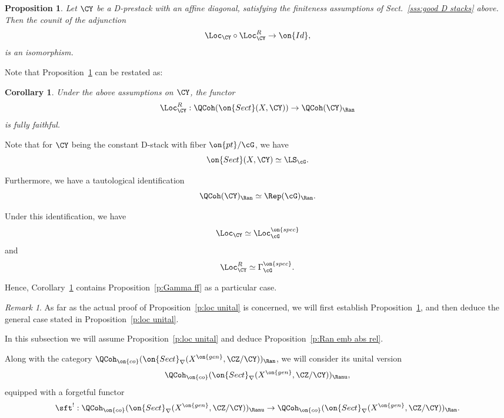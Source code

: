 \documentclass[9pt]{amsart}
\newtheorem{cor}[subsubsection]{Corollary}
\newtheorem{prop}[subsubsection]{Proposition}
\theoremstyle{remark}
\newtheorem{rem}[subsubsection]{Remark}
\theoremstyle{definition}
\theoremstyle{remark}
\newcommand{\secref}[1]{Sect.~\ref{#1}}
\newcommand{\propref}[1]{Proposition~\ref{#1}}
\newcommand{\corref}[1]{Corollary~\ref{#1}}
\numberwithin{equation}{section}
\begin{document}
\begin{prop} \label{p:loc unital fund}
Let $\CY$ be a D-prestack with an affine diagonal, satisfying the finiteness assumptions of \secref{sss:good D stacks} above. 
Then the counit of the adjunction 
$$\Loc_\CY\circ \Loc^R_\CY \to \on{Id},$$
is an isomorphism.
\end{prop} 

Note that \propref{p:loc unital fund} can be restated as:

\begin{cor} \label{c:loc unital bis}
Under the above assumptions on $\CY$, the functor
$$\Loc^R_\CY:\QCoh(\on{Sect}(X,\CY))\to \QCoh(\CY)_\Ran$$
is fully faithful.
\end{cor}

\sssec{} \label{sss:proof Gamma spec ff}

Note that for $\CY$ being the constant D-stack with fiber $\on{pt}/\cG$, we have
$$\on{Sect}(X,\CY)\simeq \LS_\cG.$$

Furthermore, we have a tautological identification
$$\QCoh(\CY)_\Ran\simeq \Rep(\cG)_\Ran.$$

Under this identification, we have
$$\Loc_\CY\simeq \Loc_\cG^{\on{spec}}$$
and
$$\Loc_\CY^R\simeq \Gamma_\cG^{\on{spec}}.$$

Hence, \corref{c:loc unital bis} contains \propref{p:Gamma ff} as a particular case.

\begin{rem}
As far as the actual proof of \propref{p:loc unital} is concerned, we will first establish \propref{p:loc unital fund}, and then deduce
the general case stated in \propref{p:loc unital}.
\end{rem}

\ssec{Proof of \propref{p:Ran emb abs rel}}

In this subsection we will assume \propref{p:loc unital} and deduce \propref{p:Ran emb abs rel}. 

\sssec{}

Along with the category $\QCoh_{\on{co}}(\on{Sect}_\nabla(X^{\on{gen}},\CZ/\CY))_\Ran$,
we will consider its unital version $$\QCoh_{\on{co}}(\on{Sect}_\nabla(X^{\on{gen}},\CZ/\CY))_\Ranu,$$
equipped with a forgetful functor 
\begin{equation} \label{e:Ranu to Ran Z/Y glob}
\sft^!:\QCoh_{\on{co}}(\on{Sect}_\nabla(X^{\on{gen}},\CZ/\CY))_\Ranu\to
\QCoh_{\on{co}}(\on{Sect}_\nabla(X^{\on{gen}},\CZ/\CY))_\Ran.
\end{equation} 
\end{document}
